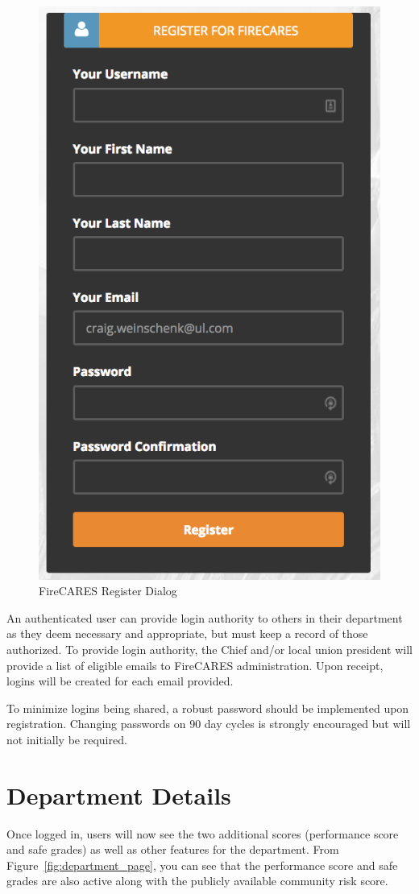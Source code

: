 \documentclass[12pt,oneside]{book}
\begin{document}
\begin{figure}[ht!]
\centering
\includegraphics[width=.5\columnwidth]{Figures/login2}
\caption{FireCARES Register Dialog}
\label{fig:login2}
\end{figure}

An authenticated user can provide login authority to others in their department as they deem necessary and appropriate, but must keep a record of those authorized. To provide login authority, the Chief and/or local union president will provide a list of eligible emails to FireCARES administration.  Upon receipt, logins will be created for each email provided.

To minimize logins being shared, a robust password should be implemented upon registration. Changing passwords on 90 day cycles is strongly encouraged but will not initially be required.

\FloatBarrier

\section{Department Details}

Once logged in, users will now see the two additional scores (performance score and safe grades) as well as other features for the department. From Figure~\ref{fig:department_page}, you can see that the performance score and safe grades are also active along with the publicly available community risk score.
\end{document}

